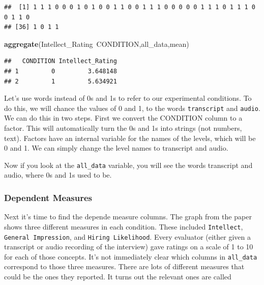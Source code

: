 \documentclass[]{book}
\newenvironment{Shaded}{\begin{snugshade}}{\end{snugshade}}
\newcommand{\KeywordTok}[1]{\textcolor[rgb]{0.13,0.29,0.53}{\textbf{{#1}}}}
\newcommand{\StringTok}[1]{\textcolor[rgb]{0.31,0.60,0.02}{{#1}}}
\newcommand{\NormalTok}[1]{{#1}}
\theoremstyle{definition}
\theoremstyle{definition}
\theoremstyle{definition}
\theoremstyle{remark}
\begin{document}
\begin{verbatim}
##  [1] 1 1 1 0 0 0 1 0 1 0 0 1 1 0 0 1 1 1 0 0 0 0 0 1 1 1 0 1 1 1 0 0 1 1 0
## [36] 1 0 1 1
\end{verbatim}

\begin{Shaded}
\begin{Highlighting}[]
\KeywordTok{aggregate}\NormalTok{(Intellect_Rating~CONDITION,all_data,mean)}
\end{Highlighting}
\end{Shaded}

\begin{verbatim}
##   CONDITION Intellect_Rating
## 1         0         3.648148
## 2         1         5.634921
\end{verbatim}

Let's use words instead of 0s and 1s to refer to our experimental
conditions. To do this, we will chance the values of 0 and 1, to the
words \texttt{transcript} and \texttt{audio}. We can do this in two
steps. First we convert the CONDITION column to a factor. This will
automatically turn the 0s and 1s into strings (not numbers, text).
Factors have an internal variable for the names of the levels, which
will be 0 and 1. We can simply change the level names to transcript and
audio.

\begin{Shaded}
\end{Shaded}

Now if you look at the \texttt{all\_data} variable, you will see the
words transcript and audio, where 0s and 1s used to be.

\subsubsection{Dependent Measures}\label{dependent-measures}

Next it's time to find the depende measure columns. The graph from the
paper shows three different measures in each condition. These included
\texttt{Intellect}, \texttt{General\ Impression}, and
\texttt{Hiring\ Likelihood}. Every evaluator (either given a transcript
or audio recording of the interview) gave ratings on a scale of 1 to 10
for each of those concepts. It's not immediately clear which columns in
\texttt{all\_data} correspond to those three measures. There are lots of
different measures that could be the ones they reported. It turns out
the relevant ones are called
\end{document}
